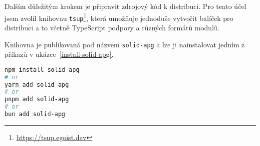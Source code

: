 Dalším důležitým krokem je připravit zdrojový kód k distribuci.
Pro tento účel jsem zvolil knihovnu \texttt{tsup}\footnote{\url{https://tsup.egoist.dev}}, která umožňuje jednoduše vytvořit balíček pro distribuci a to včetně TypeScript podpory a různých formátů modulů.

Knihovna je publikovaná pod názvem \texttt{solid-apg} a lze ji nainstalovat jedním z příkazů v ukázce~\ref{install-solid-apg}.

\begin{lstlisting}[language=bash,caption={Instalace knihovny solid-apg}, label={install-solid-apg}]
npm install solid-apg
# or
yarn add solid-apg
# or 
pnpm add solid-apg
# or
bun add solid-apg
\end{lstlisting}
